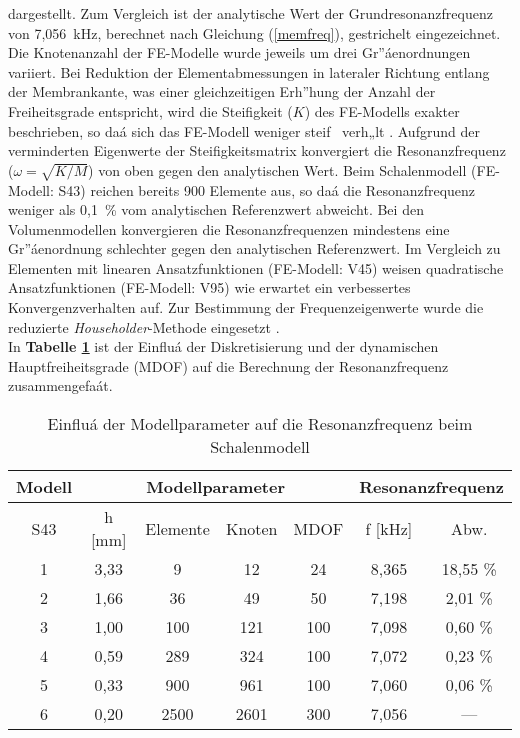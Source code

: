 dargestellt. Zum Vergleich ist der analytische Wert der
Grundresonanzfrequenz von 7,056~kHz, berechnet nach Gleichung
(\ref{memfreq}), gestrichelt eingezeichnet. Die Knotenanzahl
der FE-Modelle wurde jeweils um drei Gr”áenordnungen variiert.
Bei Reduktion der Elementabmessungen in lateraler Richtung entlang der
Membrankante, was einer gleichzeitigen Erh”hung der Anzahl der
Freiheitsgrade entspricht, wird die Steifigkeit ($K$) des FE-Modells
exakter beschrieben, so daá sich das FE-Modell weniger \glqq steif\grqq
\, verh„lt \cite{Zie84}. Aufgrund der verminderten Eigenwerte der
Steifigkeitsmatrix konvergiert die Resonanzfrequenz ($\omega = \sqrt{K/M}$)
von oben gegen den analytischen Wert.
Beim Schalenmodell (FE-Modell: S43) reichen bereits 900 Elemente aus,
so daá die Resonanzfrequenz weniger als 0,1~\% vom analytischen
Referenzwert abweicht. Bei den Volumenmodellen konvergieren die
Resonanzfrequenzen mindestens eine Gr”áenordnung schlechter gegen
den analytischen Referenzwert. Im Vergleich zu Elementen mit
linearen Ansatzfunktionen (FE-Modell: V45) weisen quadratische
Ansatzfunktionen (FE-Modell: V95) wie erwartet ein verbessertes
Konvergenzverhalten auf.
Zur Bestimmung der Frequenzeigenwerte wurde die reduzierte
{\sl Householder}-Methode eingesetzt \cite{Koh92}.\\
In {\bf Tabelle \ref{tabdiskfreq}}
ist der Einfluá der Diskretisierung und der dynamischen Hauptfreiheitsgrade
(MDOF) auf die Berechnung der Resonanzfrequenz zusammengefaát.
\begin{table}[htb]
\caption{\label{tabdiskfreq}
 Einfluá der Modellparameter auf die Resonanzfrequenz beim Schalenmodell}
\begin{center}
\begin{tabular} {|c||c|c|c|c||c|c|}
\hline
Modell & \multicolumn{4}{c||}{Modellparameter}
       & \multicolumn{2}{c|}{Resonanzfrequenz} \\
\hline
S43 & h [mm] & Elemente & Knoten & MDOF & f [kHz] & Abw. \\
\hline \hline
1  & 3,33 &    9  &    12 &  24 & 8,365 & 18,55 \% \\
2  & 1,66 &   36  &    49 &  50 & 7,198 &  2,01 \% \\
3  & 1,00 &  100  &   121 & 100 & 7,098 &  0,60 \% \\
4  & 0,59 &  289  &   324 & 100 & 7,072 &  0,23 \% \\
5  & 0,33 &  900  &   961 & 100 & 7,060 &  0,06 \% \\
6  & 0,20 & 2500  &  2601 & 300 & 7,056 &  --- \\
\hline
\end{tabular}\\
\end{center}
\end{table}
